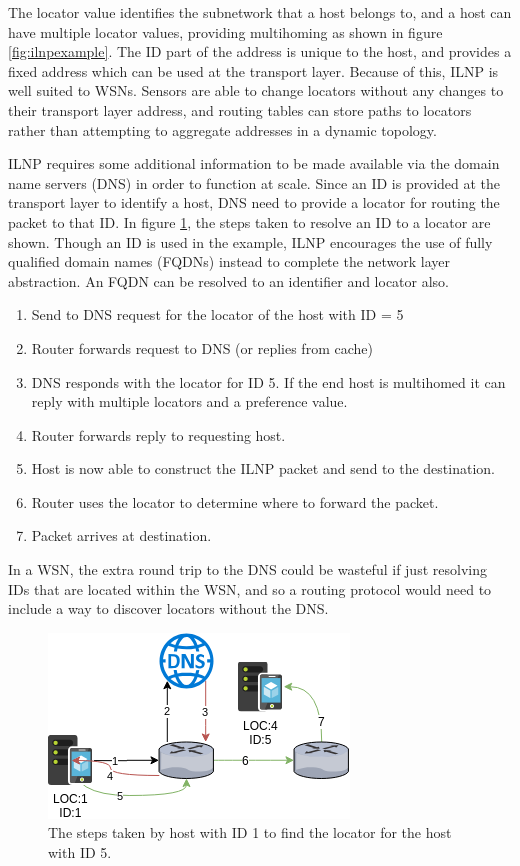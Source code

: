 \documentclass[12pt]{article}
\begin{document}
The locator value identifies the subnetwork that a host belongs to, and a host can have multiple locator values, providing multihoming as shown in figure \ref{fig:ilnpexample}. The ID part of the address is unique to the host, and provides a fixed address which can be used at the transport layer. Because of this, ILNP is well suited to WSNs. Sensors are able to change locators without any changes to their transport layer address, and routing tables can store paths to locators rather than attempting to aggregate addresses in a dynamic topology.

ILNP requires some additional information to be made available via the domain name servers (DNS) in order to function at scale. Since an ID is provided at the transport layer to identify a host, DNS need to provide a locator for routing the packet to that ID. In figure \ref{fig:ilnpdns}, the steps taken to resolve an ID to a locator are shown. Though an ID is used in the example, ILNP encourages the use of fully qualified domain names (FQDNs) instead to complete the network layer abstraction. An FQDN can be resolved to an identifier and locator also.

\begin{enumerate}
	\item Send to DNS request for the locator of the host with ID = 5
	\item Router forwards request to DNS (or replies from cache)
	\item DNS responds with the locator for ID 5. If the end host is multihomed it can reply with multiple locators and a preference value.
	\item Router forwards reply to requesting host.
	\item Host is now able to construct the ILNP packet and send to the destination.
	\item Router uses the locator to determine where to forward the packet.
	\item Packet arrives at destination.
\end{enumerate}

In a WSN, the extra round trip to the DNS could be wasteful if just resolving IDs that are located within the WSN, and so a routing protocol would need to include a way to discover locators without the DNS.

\begin{figure}[!ht]
	\centering
	\includegraphics[width=0.6\linewidth]{images/ilnpdns}
	\caption{The steps taken by host with ID 1 to find the locator for the host with ID 5.}
	\label{fig:ilnpdns}
\end{figure}
\end{document}
